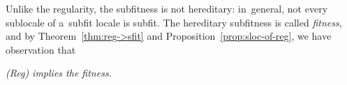 \begin{rem}[Fitness]
  Unlike the regularity, the subfitness is not hereditary:
  in~general, not every sublocale of a~subfit locale is subfit.
  The hereditary subfitness is called \emph{fitness\/}, and by
  Theorem~\ref{thm:reg->sfit} and Proposition~\ref{prop:sloc-of-reg}, we have
  observation that
  \begin{center} \it
    (Reg) implies the fitness.
  \end{center}
\end{rem}
